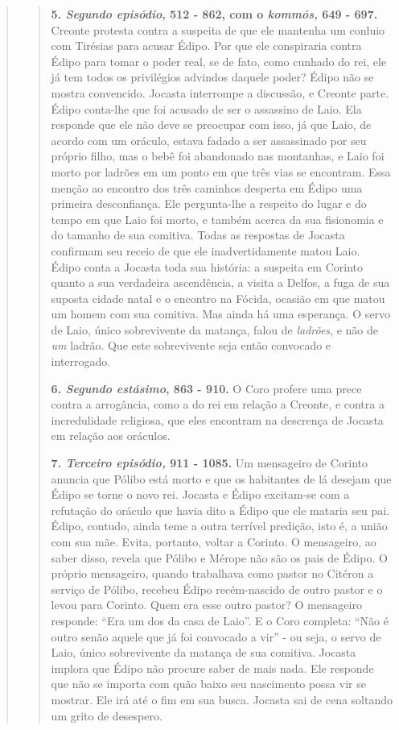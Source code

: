 \begin{verse}
\begin{verse}
\textbf{5. \emph{Segundo episódio}, 512 - 862, com o \emph{kommós,} 649
- 697.} Creonte protesta contra a suspeita de que ele mantenha um
conluio com Tirésias para acusar Édipo. Por que ele conspiraria contra
Édipo para tomar o poder real, se de fato, como cunhado do rei, ele já
tem todos os privilégios advindos daquele poder? Édipo não se mostra
convencido. Jocasta interrompe a discussão, e Creonte parte. Édipo
conta-lhe que foi acusado de ser o assassino de Laio. Ela responde que
ele não deve se preocupar com isso, já que Laio, de acordo com um
oráculo, estava fadado a ser assassinado por seu próprio filho, mas o
bebê foi abandonado nas montanhas, e Laio foi morto por ladrões em um
ponto em que três vias se encontram. Essa menção ao encontro dos três
caminhos desperta em Édipo uma primeira desconfiança. Ele pergunta-lhe a
respeito do lugar e do tempo em que Laio foi morto, e também acerca da
sua fisionomia e do tamanho de sua comitiva. Todas as respostas de
Jocasta confirmam seu receio de que ele inadvertidamente matou Laio.
Édipo conta a Jocasta toda sua história: a suspeita em Corinto quanto a
sua verdadeira ascendência, a visita a Delfos, a fuga de sua suposta
cidade natal e o encontro na Fócida, ocasião em que matou um homem com
sua comitiva. Mas ainda há uma esperança. O servo de Laio, único
sobrevivente da matança, falou de \emph{ladrões}, e não de \emph{um}
ladrão. Que este sobrevivente seja então convocado e interrogado.

\textbf{6. \emph{Segundo estásimo}, 863 - 910.} O Coro profere uma prece
contra a arrogância, como a do rei em relação a Creonte, e contra a
incredulidade religiosa, que eles encontram na descrença de Jocasta em
relação aos oráculos.

\textbf{7. \emph{Terceiro episódio,} 911 - 1085.} Um mensageiro de
Corinto anuncia que Pólibo está morto e que os habitantes de lá desejam
que Édipo se torne o novo rei. Jocasta e Édipo excitam-se com a
refutação do oráculo que havia dito a Édipo que ele mataria seu pai.
Édipo, contudo, ainda teme a outra terrível predição, isto é, a união
com sua mãe. Evita, portanto, voltar a Corinto. O mensageiro, ao saber
disso, revela que Pólibo e Mérope não são os pais de Édipo. O próprio
mensageiro, quando trabalhava como pastor no Citéron a serviço de
Pólibo, recebeu Édipo recém-nascido de outro pastor e o levou para
Corinto. Quem era esse outro pastor? O mensageiro responde: ``Era um dos
da casa de Laio''. E o Coro completa: ``Não é outro senão aquele que já
foi convocado a vir'' - ou seja, o servo de Laio, único sobrevivente da
matança de sua comitiva. Jocasta implora que Édipo não procure saber de
mais nada. Ele responde que não se importa com quão baixo seu nascimento
possa vir se mostrar. Ele irá até o fim em sua busca. Jocasta sai de
cena soltando um grito de desespero.


\end{verse}
\end{verse}
